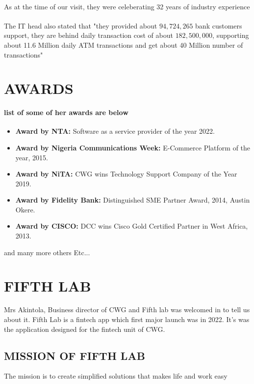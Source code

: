 \documentclass[a4paper,12pt]{report}
\begin{document}
\paragraph{}
As at the time of our visit, they were celeberating 32 years of industry experience

\paragraph{}
The IT head also stated that "they provided about $94,724,265$ bank customers support, they are behind daily transaction cost of about $182,500,000$, supporting about 11.6 Million daily ATM transactions and get about 40 Million number of transactions"

\section[Awards]{AWARDS}

\paragraph{list of some of her awards are below}
\begin{itemize}
    \item \textbf{Award by NTA:} Software as a service provider of the year 2022.
    \item \textbf{Award by Nigeria Communications Week:} E-Commerce Platform of the year, 2015.
    \item \textbf{Award by NiTA:} CWG wins Technology Support Company of the Year 2019.
    \item \textbf{Award by Fidelity Bank:} Distinguished SME Partner Award, 2014, Austin Okere.
    \item \textbf{Award by CISCO:} DCC wins Cisco Gold Certified Partner in West Africa, 2013.
\end{itemize}
and many more others Etc...

\section[Fifth lab]{FIFTH LAB}
Mrs Akintola, Business director of CWG and Fifth lab was welcomed in to tell us about it.
Fifth Lab is a fintech app which first major launch was in 2022. It's was the application designed for the fintech unit of CWG.

\subsection[Fifth lab Mission]{MISSION OF FIFTH LAB}
The mission is to create simplified solutions that makes life and work easy
\end{document}
